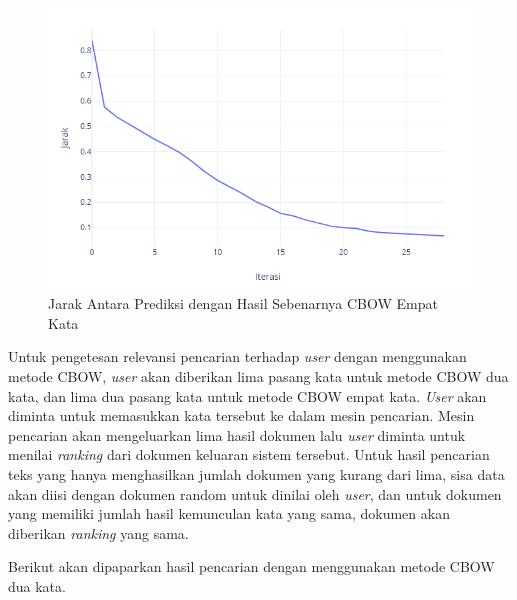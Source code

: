 \documentclass[12pt]{report}
\begin{document}
\begin{figure}[H]
\centering
\includegraphics[scale=0.75]{jarakcbow4kata}
\caption{Jarak Antara Prediksi dengan Hasil Sebenarnya CBOW Empat Kata}
\label{jarakcbow4kata}
\end{figure}

Untuk pengetesan relevansi pencarian terhadap \textit{user} dengan menggunakan metode CBOW, \textit{user} akan diberikan lima pasang kata untuk metode CBOW dua kata, dan lima dua pasang kata untuk metode CBOW empat kata. \textit{User} akan diminta untuk memasukkan kata tersebut ke dalam mesin pencarian. Mesin pencarian akan mengeluarkan lima hasil dokumen lalu \textit{user} diminta untuk menilai \textit{ranking} dari dokumen keluaran sistem tersebut. Untuk hasil pencarian teks yang hanya menghasilkan jumlah dokumen yang kurang dari lima, sisa data akan diisi dengan dokumen random untuk dinilai oleh \textit{user}, dan untuk dokumen yang memiliki jumlah hasil kemunculan kata yang sama, dokumen akan diberikan \textit{ranking} yang sama.

Berikut akan dipaparkan hasil pencarian dengan menggunakan metode CBOW dua kata.
\end{document}
